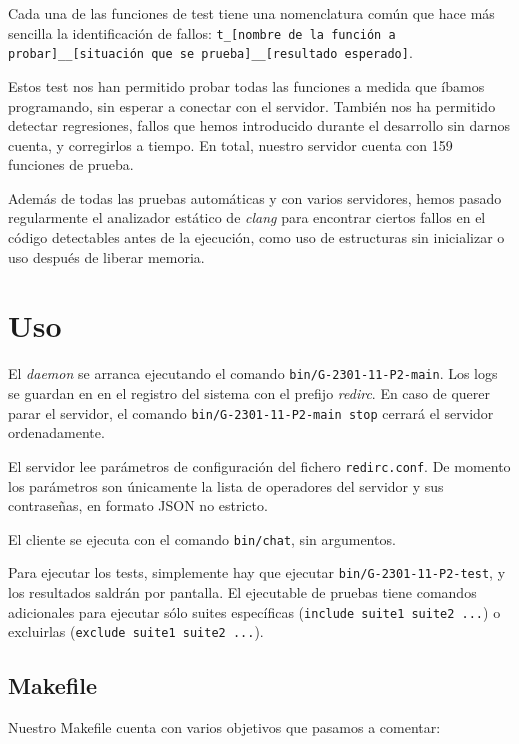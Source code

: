 \documentclass{article}
\begin{document}
Cada una de las funciones de test tiene una nomenclatura común que hace más sencilla la identificación de fallos: \texttt{t\_[nombre de la función a probar]\_\_[situación que se prueba]\_\_[resultado esperado]}.

Estos test nos han permitido probar todas las funciones a medida que íbamos programando, sin esperar a conectar con el servidor. También nos ha permitido detectar regresiones, fallos que hemos introducido durante el desarrollo sin darnos cuenta, y corregirlos a tiempo. En total, nuestro servidor cuenta con 159 funciones de prueba.

Además de todas las pruebas automáticas y con varios servidores, hemos pasado regularmente el analizador estático de \textit{clang} para encontrar ciertos fallos en el código detectables antes de la ejecución, como uso de estructuras sin inicializar o uso después de liberar memoria.

\section{Uso}

El \textit{daemon} se arranca ejecutando el comando \texttt{bin/G-2301-11-P2-main}. Los logs se guardan en en el registro del sistema con el prefijo \textit{redirc}. En caso de querer parar el servidor, el comando \texttt{bin/G-2301-11-P2-main stop} cerrará el servidor ordenadamente.

El servidor lee parámetros de configuración del fichero \texttt{redirc.conf}. De momento los parámetros son únicamente la lista de operadores del servidor y sus contraseñas, en formato JSON no estricto.

El cliente se ejecuta con el comando \texttt{bin/chat}, sin argumentos.

Para ejecutar los tests, simplemente hay que ejecutar \texttt{bin/G-2301-11-P2-test}, y los resultados saldrán por pantalla. El ejecutable de pruebas tiene comandos adicionales para ejecutar sólo suites específicas (\texttt{include suite1 suite2 ...}) o excluirlas (\texttt{exclude suite1 suite2 ...}).

\subsection{Makefile}

Nuestro Makefile cuenta con varios objetivos que pasamos a comentar:
\end{document}
